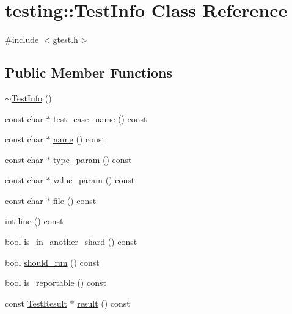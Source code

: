 \hypertarget{classtesting_1_1TestInfo}{}\section{testing\+::Test\+Info Class Reference}
\label{classtesting_1_1TestInfo}


{\ttfamily \#include $<$gtest.\+h$>$}

\subsection*{Public Member Functions}
\begin{DoxyCompactItemize}
\item 
\mbox{\hyperlink{classtesting_1_1TestInfo_a8d382c1b1b511f0d9112c14684809852}{$\sim$\+Test\+Info}} ()
\item 
const char $\ast$ \mbox{\hyperlink{classtesting_1_1TestInfo_a036a20710c8c2252889544daba9a8ff9}{test\+\_\+case\+\_\+name}} () const
\item 
const char $\ast$ \mbox{\hyperlink{classtesting_1_1TestInfo_ac2581b45eccc9a3b94cb41c4807d0e34}{name}} () const
\item 
const char $\ast$ \mbox{\hyperlink{classtesting_1_1TestInfo_a7759bc57f4350ad406cbbb0b3bcea320}{type\+\_\+param}} () const
\item 
const char $\ast$ \mbox{\hyperlink{classtesting_1_1TestInfo_abdf2c6cfcf4819e725816c64e1c1fc24}{value\+\_\+param}} () const
\item 
const char $\ast$ \mbox{\hyperlink{classtesting_1_1TestInfo_a9b74d79cf618ce5bb0d0b1da75ee8b35}{file}} () const
\item 
int \mbox{\hyperlink{classtesting_1_1TestInfo_af5931cfc594b5d660c56b3c61c41ea13}{line}} () const
\item 
bool \mbox{\hyperlink{classtesting_1_1TestInfo_a8621f2cf7623fd1609db8e324f0c2fec}{is\+\_\+in\+\_\+another\+\_\+shard}} () const
\item 
bool \mbox{\hyperlink{classtesting_1_1TestInfo_a866e33b5bc5ab2a6e5375fc7d3af0f96}{should\+\_\+run}} () const
\item 
bool \mbox{\hyperlink{classtesting_1_1TestInfo_a63e7042028b0b846f4b5a1e5bcffc079}{is\+\_\+reportable}} () const
\item 
const \mbox{\hyperlink{classtesting_1_1TestResult}{Test\+Result}} $\ast$ \mbox{\hyperlink{classtesting_1_1TestInfo_aee8cb884c95cd446129aba936b4159e0}{result}} () const
\end{DoxyCompactItemize}
